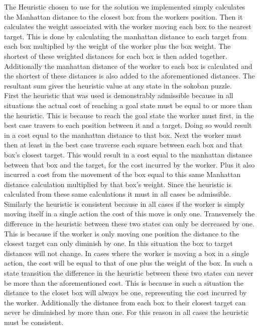 \documentclass[a4paper,12pt]{article}
\begin{document}
The Heuristic chosen to use for the solution we implemented simply calculates the Manhattan distance to the closest box from the workers position. Then it calculates the weight associated with the worker moving each box to the nearest target. This is done by calculating the manhattan distance to each target from each box multiplied by the weight of the worker plus the box weight. The shortest of these weighted distances for each box is then added together. Additionally the manhattan distance of the worker to each box is calculated and the shortest of these distances is also added to the aforementioned distances. The resultant sum gives the heuristic value at any state in the sokoban puzzle.
\\

First the heuristic that was used is demonstrably admissible because in all situations the actual cost of reaching a goal state must be equal to or more than the heuristic. This is because to reach the goal state the worker must first, in the best case travers to each position between it and a target. Doing so would result in a cost equal to the manhattan distance to that box. Next the worker must then at least in the best case traverse each square between each box and that box's closest target. This would result in a cost equal to the manhattan distance between that box and the target, for the cost incurred by the worker. Plus it also incurred a cost from the movement of the box equal to this same Manhattan distance calculation multiplied by that box's weight. Since the heuristic is calculated from these same calculations it must in all cases be admissible. 
\\

Similarly the heuristic is consistent because in all cases if the worker is simply moving itself in a single action the cost of this move is only one. Transversely the difference in the heuristic between these two states can only be decreased by one. This is because if the worker is only moving one position the distance to the closest target can only diminish by one. In this situation the box to target distances will not change. In cases where the worker is moving a box in a single action, the cost will be equal to that of one plus the weight of the box. In such a state transition the difference in the heuristic between these two states can never be more than the aforementioned cost. This is because in such a situation the distance to the closet box will always be one, representing the cost incurred by the worker. Additionally the distance from each box to their closest target can never be diminished by more than one. For this reason in all cases the heuristic must be consistent.
\end{document}
